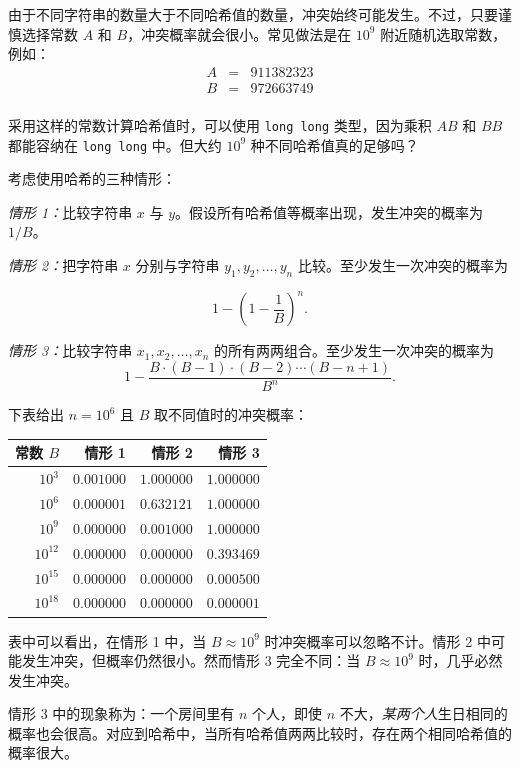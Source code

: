 由于不同字符串的数量大于不同哈希值的数量，冲突始终可能发生。不过，只要谨慎选择常数 $A$ 和 $B$，冲突概率就会很小。常见做法是在 $10^9$ 附近随机选取常数，例如：
\[
\begin{array}{lcl}
A & = & 911382323 \\
B & = & 972663749 \\
\end{array}
\]

采用这样的常数计算哈希值时，可以使用 \texttt{long long} 类型，因为乘积 $AB$ 和 $BB$ 都能容纳在 \texttt{long long} 中。但大约 $10^9$ 种不同哈希值真的足够吗？

考虑使用哈希的三种情形：

\textit{情形 1：}比较字符串 $x$ 与 $y$。假设所有哈希值等概率出现，发生冲突的概率为 $1/B$。

\textit{情形 2：}把字符串 $x$ 分别与字符串 $y_1,y_2,\ldots,y_n$ 比较。至少发生一次冲突的概率为

\[1-(1-\frac{1}{B})^n.\]

\textit{情形 3：}比较字符串 $x_1,x_2,\ldots,x_n$ 的所有两两组合。至少发生一次冲突的概率为
\[ 1 - \frac{B \cdot (B-1) \cdot (B-2) \cdots (B-n+1)}{B^n}.\]

下表给出 $n=10^6$ 且 $B$ 取不同值时的冲突概率：

\begin{center}
\begin{tabular}{rrrr}
常数 $B$ & 情形 1 & 情形 2 & 情形 3 \\
\hline
$10^3$ & $0.001000$ & $1.000000$ & $1.000000$ \\
$10^6$ & $0.000001$ & $0.632121$ & $1.000000$ \\
$10^9$ & $0.000000$ & $0.001000$ & $1.000000$ \\
$10^{12}$ & $0.000000$ & $0.000000$ & $0.393469$ \\
$10^{15}$ & $0.000000$ & $0.000000$ & $0.000500$ \\
$10^{18}$ & $0.000000$ & $0.000000$ & $0.000001$ \\
\end{tabular}
\end{center}

表中可以看出，在情形 1 中，当 $B \approx 10^9$ 时冲突概率可以忽略不计。情形 2 中可能发生冲突，但概率仍然很小。然而情形 3 完全不同：当 $B \approx 10^9$ 时，几乎必然发生冲突。


情形 3 中的现象称为：一个房间里有 $n$ 个人，即使 $n$ 不大，\emph{某两个人}生日相同的概率也会很高。对应到哈希中，当所有哈希值两两比较时，存在两个相同哈希值的概率很大。

